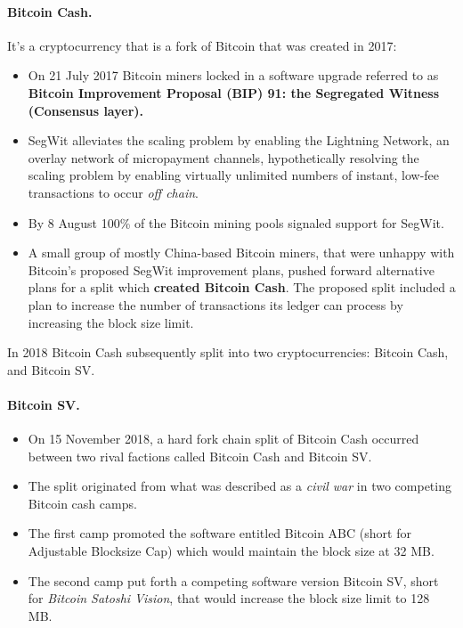 \paragraph{Bitcoin Cash.}

It's a cryptocurrency that is a fork of Bitcoin that was created in 2017:
\begin{itemize}
    \item On 21 July 2017 Bitcoin miners locked in a software upgrade referred to as \textbf{Bitcoin Improvement Proposal (BIP) 91: the Segregated Witness (Consensus layer).}
    \item SegWit alleviates the scaling problem by enabling the Lightning Network, an overlay network of micropayment channels, hypothetically resolving the scaling problem by enabling virtually unlimited numbers of instant, low-fee transactions to occur \textit{off chain}.
    \item By 8 August 100\% of the Bitcoin mining pools signaled support for SegWit.
    \item A small group of mostly China-based Bitcoin miners, that were unhappy with Bitcoin's proposed SegWit improvement plans, pushed forward alternative plans for a split which \textbf{created Bitcoin Cash}. The proposed split included a plan to increase the number of transactions its ledger can process by increasing the block size limit.
\end{itemize}

In 2018 Bitcoin Cash subsequently split into two cryptocurrencies: Bitcoin Cash, and Bitcoin SV.

\paragraph*{Bitcoin SV.}
\begin{itemize}
    \item On 15 November 2018, a hard fork chain split of Bitcoin Cash occurred between two rival factions called Bitcoin Cash and Bitcoin SV.
    \item The split originated from what was described as a \textit{civil war} in two competing Bitcoin cash camps.
    \item The first camp promoted the software entitled Bitcoin ABC (short for Adjustable Blocksize Cap) which would maintain the block size at 32 MB.
    \item The second camp put forth a competing software version Bitcoin SV, short for \emph{Bitcoin Satoshi Vision}, that would increase the block size limit to 128 MB.
\end{itemize}


